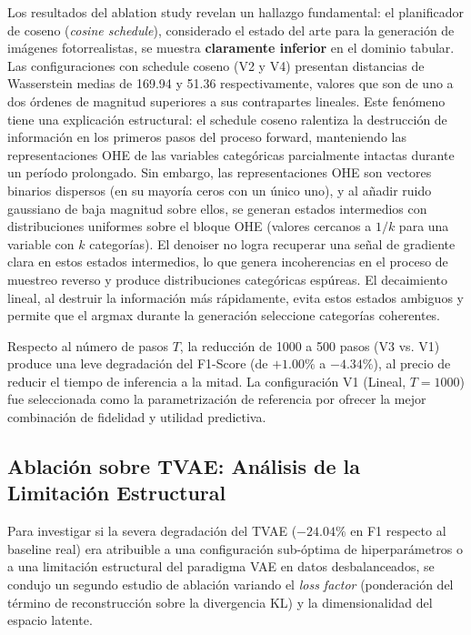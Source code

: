 Los resultados del ablation study revelan un hallazgo fundamental: el planificador de coseno (\textit{cosine schedule}), considerado el estado del arte para la generación de imágenes fotorrealistas, se muestra \textbf{claramente inferior} en el dominio tabular. Las configuraciones con schedule coseno (V2 y V4) presentan distancias de Wasserstein medias de 169.94 y 51.36 respectivamente, valores que son de uno a dos órdenes de magnitud superiores a sus contrapartes lineales. Este fenómeno tiene una explicación estructural: el schedule coseno ralentiza la destrucción de información en los primeros pasos del proceso forward, manteniendo las representaciones OHE de las variables categóricas parcialmente intactas durante un período prolongado. Sin embargo, las representaciones OHE son vectores binarios dispersos (en su mayoría ceros con un único uno), y al añadir ruido gaussiano de baja magnitud sobre ellos, se generan estados intermedios con distribuciones uniformes sobre el bloque OHE (valores cercanos a $1/k$ para una variable con $k$ categorías). El denoiser no logra recuperar una señal de gradiente clara en estos estados intermedios, lo que genera incoherencias en el proceso de muestreo reverso y produce distribuciones categóricas espúreas. El decaimiento lineal, al destruir la información más rápidamente, evita estos estados ambiguos y permite que el argmax durante la generación seleccione categorías coherentes.

Respecto al número de pasos $T$, la reducción de 1000 a 500 pasos (V3 vs. V1) produce una leve degradación del F1-Score (de $+1.00\%$ a $-4.34\%$), al precio de reducir el tiempo de inferencia a la mitad. La configuración V1 (Lineal, $T=1000$) fue seleccionada como la parametrización de referencia por ofrecer la mejor combinación de fidelidad y utilidad predictiva.

\subsection{Ablación sobre TVAE: Análisis de la Limitación Estructural}

Para investigar si la severa degradación del TVAE ($-24.04\%$ en F1 respecto al baseline real) era atribuible a una configuración sub-óptima de hiperparámetros o a una limitación estructural del paradigma VAE en datos desbalanceados, se condujo un segundo estudio de ablación variando el \textit{loss factor} (ponderación del término de reconstrucción sobre la divergencia KL) y la dimensionalidad del espacio latente.

